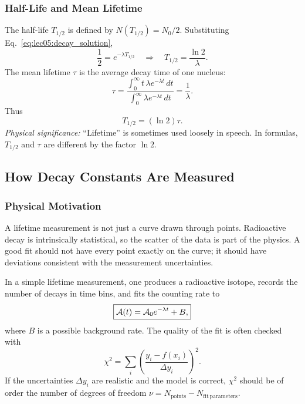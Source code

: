 \subsubsection{Half-Life and Mean Lifetime}
\label{subsubsec:lec05:half_life}

The half-life \(T_{1/2}\) is defined by \(N(T_{1/2})=N_0/2\).  Substituting
Eq.~\eqref{eq:lec05:decay_solution},
\begin{equation}
  \label{eq:lec05:half_life_derivation}
  \frac{1}{2}=e^{-\lambda T_{1/2}}
  \quad\Rightarrow\quad
  \boxed{T_{1/2}=\frac{\ln2}{\lambda}.}
\end{equation}
The mean lifetime \(\tau\) is the average decay time of one nucleus:
\begin{equation}
  \label{eq:lec05:mean_lifetime}
  \boxed{\tau=\frac{\int_0^\infty t\,\lambda e^{-\lambda t}\,dt}
  {\int_0^\infty \lambda e^{-\lambda t}\,dt}
  =\frac{1}{\lambda}.}
\end{equation}
Thus
\begin{equation}
  \label{eq:lec05:tau_half_life_relation}
  \boxed{T_{1/2}=(\ln2)\tau.}
\end{equation}
\textit{Physical significance:} ``Lifetime'' is sometimes used loosely in
speech.  In formulas, \(T_{1/2}\) and \(\tau\) are different by the factor
\(\ln2\).

\subsection{How Decay Constants Are Measured}
\label{subsec:lec05:measuring_lifetimes}

\subsubsection*{Physical Motivation}
A lifetime measurement is not just a curve drawn through points.  Radioactive
decay is intrinsically statistical, so the scatter of the data is part of the
physics.  A good fit should not have every point exactly on the curve; it should
have deviations consistent with the measurement uncertainties.

In a simple lifetime measurement, one produces a radioactive isotope, records
the number of decays in time bins, and fits the counting rate to
\begin{equation}
  \label{eq:lec05:counting_fit}
  \boxed{\mathcal{A}(t)=\mathcal{A}_0e^{-\lambda t}+B,}
\end{equation}
where \(B\) is a possible background rate.  The quality of the fit is often
checked with
\begin{equation}
  \label{eq:lec05:chi_squared}
  \boxed{\chi^2=\sum_i
  \left(\frac{y_i-f(x_i)}{\Delta y_i}\right)^2.}
\end{equation}
If the uncertainties \(\Delta y_i\) are realistic and the model is correct,
\(\chi^2\) should be of order the number of degrees of freedom
\(\nu=N_\mathrm{points}-N_\mathrm{fit\,parameters}\).

